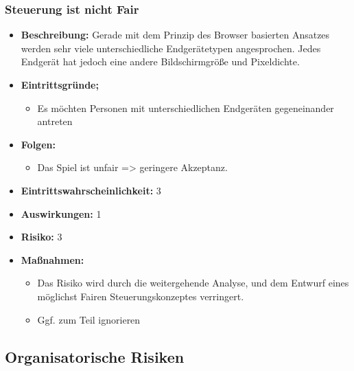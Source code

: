 \subsubsection{Steuerung ist nicht Fair}
\begin{itemize}
	\item \textbf{Beschreibung:} \newline
	Gerade mit dem Prinzip des Browser basierten Ansatzes werden sehr viele unterschiedliche Endgerätetypen angesprochen. Jedes Endgerät hat jedoch eine andere Bildschirmgröße und Pixeldichte.
	\item \textbf{Eintrittsgründe;}
	\begin{itemize}
		\item Es möchten Personen mit unterschiedlichen Endgeräten gegeneinander antreten
	\end{itemize}
	\item \textbf{Folgen:}
	\begin{itemize}
		\item Das Spiel ist unfair => geringere Akzeptanz.
	\end{itemize}
	\item \textbf{Eintrittswahrscheinlichkeit:} 3
	\item \textbf{Auswirkungen:} 1
	\item \textbf{Risiko:} 3
	\item \textbf{Maßnahmen:}
	\begin{itemize}
		\item Das Risiko wird durch die weitergehende Analyse, und dem Entwurf eines möglichst Fairen Steuerungskonzeptes verringert.
		\item Ggf. zum Teil ignorieren
	\end{itemize}
\end{itemize}
\subsection{Organisatorische Risiken}
